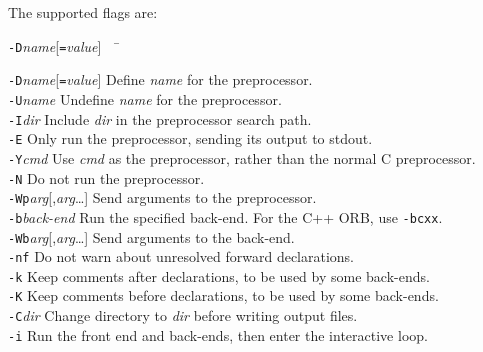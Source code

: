 \documentclass[11pt,twoside,a4paper]{article}
\newcommand{\cmdline}[1]{\texttt{#1}}
\begin{document}
The supported flags are:

\begin{tabbing}
\cmdline{-D}\textit{name}[\cmdline{=}\textit{value}]~~ \= \kill

\cmdline{-D}\textit{name}[\cmdline{=}\textit{value}]
     \> Define \textit{name} for the preprocessor.\\

\cmdline{-U}\textit{name}
     \> Undefine \textit{name} for the preprocessor.\\

\cmdline{-I}\textit{dir}
     \> Include \textit{dir} in the preprocessor search path.\\

\cmdline{-E}
     \> Only run the preprocessor, sending its output to stdout.\\

\cmdline{-Y}\textit{cmd}
     \> Use \textit{cmd} as the preprocessor, rather than the normal C
        preprocessor.\\

\cmdline{-N}
     \> Do not run the preprocessor.\\

\cmdline{-Wp}\textit{arg}[,\textit{arg}\dots]
     \> Send arguments to the preprocessor.\\

\cmdline{-b}\textit{back-end}
     \> Run the specified back-end. For the C++ ORB, use \cmdline{-bcxx}.\\

\cmdline{-Wb}\textit{arg}[,\textit{arg}\dots]
     \> Send arguments to the back-end.\\

\cmdline{-nf}
     \> Do not warn about unresolved forward declarations.\\

\cmdline{-k}
     \> Keep comments after declarations, to be used by some back-ends.\\

\cmdline{-K}
     \> Keep comments before declarations, to be used by some back-ends.\\

\cmdline{-C}\textit{dir}
     \> Change directory to \textit{dir} before writing output files.\\

\cmdline{-i}
     \> Run the front end and back-ends, then enter the interactive loop.\\


\end{tabbing}
\end{document}
